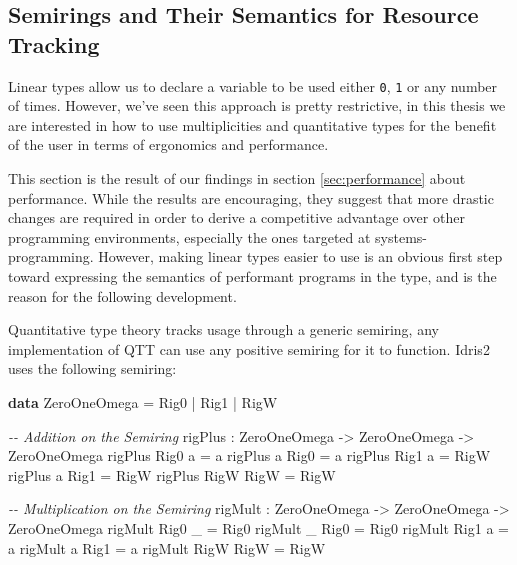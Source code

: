 \documentclass[
]{article}
\newenvironment{Shaded}{}{}
\newcommand{\CommentTok}[1]{\textcolor[rgb]{0.38,0.63,0.69}{\textit{#1}}}
\newcommand{\DataTypeTok}[1]{\textcolor[rgb]{0.56,0.13,0.00}{#1}}
\newcommand{\KeywordTok}[1]{\textcolor[rgb]{0.00,0.44,0.13}{\textbf{#1}}}
\newcommand{\NormalTok}[1]{#1}
\newcommand{\OperatorTok}[1]{\textcolor[rgb]{0.40,0.40,0.40}{#1}}
\newcommand{\OtherTok}[1]{\textcolor[rgb]{0.00,0.44,0.13}{#1}}
\begin{document}
\hypertarget{semirings-and-their-semantics-for-resource-tracking}{%
\subsection{Semirings and Their Semantics for Resource
Tracking}\label{semirings-and-their-semantics-for-resource-tracking}}

\label{subsec:semiring-semantics}

Linear types allow us to declare a variable to be used either
\texttt{0}, \texttt{1} or any number of times. However, we've seen this
approach is pretty restrictive, in this thesis we are interested in how
to use multiplicities and quantitative types for the benefit of the user
in terms of ergonomics and performance.

This section is the result of our findings in section
\ref{sec:performance} about performance. While the results are
encouraging, they suggest that more drastic changes are required in
order to derive a competitive advantage over other programming
environments, especially the ones targeted at systems-programming.
However, making linear types easier to use is an obvious first step
toward expressing the semantics of performant programs in the type, and
is the reason for the following development.

Quantitative type theory tracks usage through a generic semiring, any
implementation of QTT can use any positive semiring for it to function.
Idris2 uses the following semiring:

\begin{Shaded}
\begin{Highlighting}[]
\KeywordTok{data} \DataTypeTok{ZeroOneOmega} \OtherTok{=} \DataTypeTok{Rig0} \OperatorTok{|} \DataTypeTok{Rig1} \OperatorTok{|} \DataTypeTok{RigW}

\CommentTok{{-}{-} Addition on the Semiring}
\NormalTok{rigPlus }\OperatorTok{:} \DataTypeTok{ZeroOneOmega} \OtherTok{{-}\textgreater{}} \DataTypeTok{ZeroOneOmega} \OtherTok{{-}\textgreater{}} \DataTypeTok{ZeroOneOmega}
\NormalTok{rigPlus }\DataTypeTok{Rig0}\NormalTok{ a }\OtherTok{=}\NormalTok{ a}
\NormalTok{rigPlus a }\DataTypeTok{Rig0} \OtherTok{=}\NormalTok{ a}
\NormalTok{rigPlus }\DataTypeTok{Rig1}\NormalTok{ a }\OtherTok{=} \DataTypeTok{RigW}
\NormalTok{rigPlus a }\DataTypeTok{Rig1} \OtherTok{=} \DataTypeTok{RigW}
\NormalTok{rigPlus }\DataTypeTok{RigW} \DataTypeTok{RigW} \OtherTok{=} \DataTypeTok{RigW}

\CommentTok{{-}{-} Multiplication on the Semiring}
\NormalTok{rigMult }\OperatorTok{:} \DataTypeTok{ZeroOneOmega} \OtherTok{{-}\textgreater{}} \DataTypeTok{ZeroOneOmega} \OtherTok{{-}\textgreater{}} \DataTypeTok{ZeroOneOmega}
\NormalTok{rigMult }\DataTypeTok{Rig0}\NormalTok{ \_ }\OtherTok{=} \DataTypeTok{Rig0}
\NormalTok{rigMult \_ }\DataTypeTok{Rig0} \OtherTok{=} \DataTypeTok{Rig0}
\NormalTok{rigMult }\DataTypeTok{Rig1}\NormalTok{ a }\OtherTok{=}\NormalTok{ a}
\NormalTok{rigMult a }\DataTypeTok{Rig1} \OtherTok{=}\NormalTok{ a}
\NormalTok{rigMult }\DataTypeTok{RigW} \DataTypeTok{RigW} \OtherTok{=} \DataTypeTok{RigW}
\end{Highlighting}
\end{Shaded}
\end{document}
